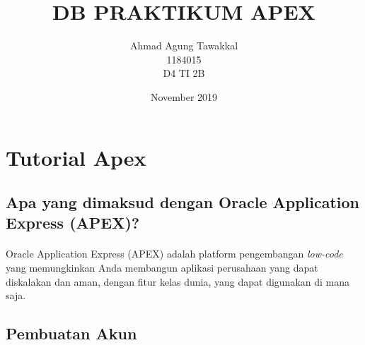 \documentclass{article}
\title{DB PRAKTIKUM APEX}
\author{Ahmad Agung Tawakkal\\1184015\\D4 TI 2B}
\date{November 2019}
\begin{document}
\maketitle

\newpage

\section{Tutorial Apex}
    \subsection{Apa yang dimaksud dengan Oracle Application Express (APEX)?}
    \paragraph{}Oracle Application Express (APEX) adalah platform pengembangan \textit{low-code} yang memungkinkan Anda membangun aplikasi perusahaan yang dapat diskalakan dan aman, dengan fitur kelas dunia, yang dapat digunakan di mana saja.
    \subsection{Pembuatan Akun}
\end{document}
